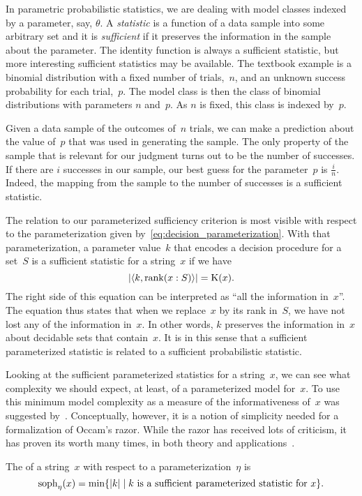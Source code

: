 \begin{example}
  In parametric probabilistic statistics, we are dealing with model classes indexed by a parameter, say, $\theta$.
  A \emph{statistic} is a function of a data sample into some arbitrary set and it is \emph{sufficient} if it preserves the information in the sample about the parameter.
  The identity function is always a sufficient statistic, but more interesting sufficient statistics may be available.
  The textbook example is a binomial distribution with a fixed number of trials,~$n$, and an unknown success probability for each trial,~$p$.
  The model class is then the class of binomial distributions with parameters $n$ and~$p$.
  As $n$ is fixed, this class is indexed by~$p$.

  Given a data sample of the outcomes of~$n$ trials, we can make a prediction about the value of~$p$ that was used in generating the sample.
  The only property of the sample that is relevant for our judgment turns out to be the number of successes.
  If there are $i$ successes in our sample, our best guess for the parameter~$p$ is $\frac{i}{n}$.
  Indeed, the mapping from the sample to the number of successes is a sufficient statistic.

  The relation to our parameterized sufficiency criterion is most visible with respect to the parameterization given by~\eqref{eq:decision_parameterization}.
  With that parameterization, a parameter value~$k$ that encodes a decision procedure for a set~$S$ is a sufficient statistic for a string~$x$ if we have
  \begin{equation*}
    {\lvert{\langle k, \operatorname{rank}(x : S)\rangle}\rvert} = \operatorname{K}(x).
  \end{equation*}
  The right side of this equation can be interpreted as \enquote{all the information in~$x$}.
  The equation thus states that when we replace~$x$ by its rank in~$S$, we have not lost any of the information in~$x$.
  In other words, $k$ preserves the information in~$x$ about decidable sets that contain~$x$.
  It is in this sense that a sufficient parameterized statistic is related to a sufficient probabilistic statistic.
\end{example}

Looking at the sufficient parameterized statistics for a string~$x$, we can see what complexity we should expect, at least, of a parameterized model for~$x$.
To use this minimum model complexity as a measure of the informativeness of~$x$ was suggested by~\textcite{koppel1988structure}.
Conceptually, however, it is a notion of simplicity needed for a formalization of Occam's razor.
While the razor has received lots of criticism, it has proven its worth many times, in both theory and applications~\parencite{grunwald2007minimum}.
\begin{definition}
  The  of a string~$x$ with respect to a parameterization~$\eta$ is
  \begin{equation*}
    \operatorname{soph}_\eta(x) = \min\{{\lvert k\rvert} \;|\; \text{$k$ is a sufficient parameterized statistic for $x$}\}.
  \end{equation*}
\end{definition}


